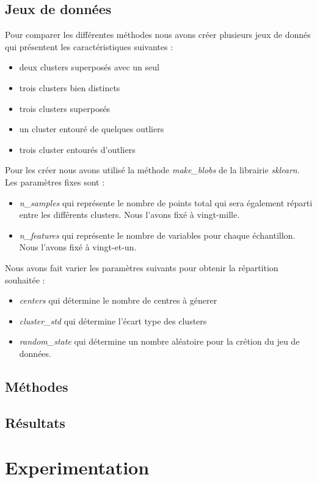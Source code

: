 \subsection{Jeux de données}
Pour comparer les différentes méthodes nous avons créer plusieurs jeux de donnés qui présentent les caractéristiques suivantes :
\begin{itemize}
    \item deux clusters superposés avec un seul
    \item  trois clusters bien distincts
    \item trois clusters superposés
    \item un cluster entouré de quelques outliers
    \item trois cluster entourés d’outliers
\end{itemize}
Pour les créer nous avons utilisé la méthode \textit{make_blobs} de la librairie \textit{sklearn}. Les paramètres fixes sont :
\begin{itemize}
    \item \textit{n_samples} qui représente le nombre de points total qui sera également réparti entre les différents clusters. Nous l'avons fixé à vingt-mille.
    \item \textit{n_features} qui représente le nombre de variables pour chaque échantillon. Nous l'avons fixé à vingt-et-un.
\end{itemize}
Nous avons fait varier les paramètres suivants pour obtenir la répartition souhaitée : 
\begin{itemize}
    \item \textit{centers} qui détermine le nombre de centres à génerer
    \item \textit{cluster_std} qui détermine l'écart type des clusters
    \item \textit{random_state} qui détermine un nombre aléatoire pour la crétion du jeu de données.
\end{itemize}


\subsection{Méthodes}

\subsection{Résultats}

\section{Experimentation}
